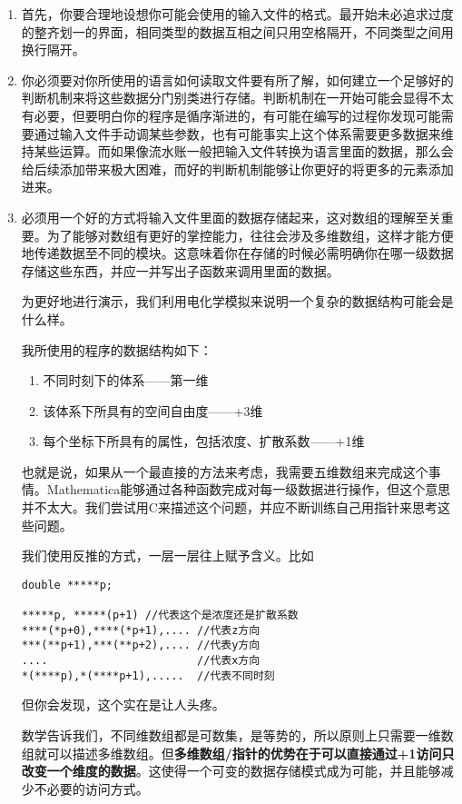 \documentclass[12pt,a4paper]{article}
\begin{document}
\begin{enumerate}
\item 首先，你要合理地设想你可能会使用的输入文件的格式。最开始未必追求过度的整齐划一的界面，相同类型的数据互相之间只用空格隔开，不同类型之间用换行隔开。

\item 你必须要对你所使用的语言如何读取文件要有所了解，如何建立一个足够好的判断机制来将这些数据分门别类进行存储。判断机制在一开始可能会显得不太有必要，但要明白你的程序是循序渐进的，有可能在编写的过程你发现可能需要通过输入文件手动调某些参数，也有可能事实上这个体系需要更多数据来维持某些运算。而如果像流水账一般把输入文件转换为语言里面的数据，那么会给后续添加带来极大困难，而好的判断机制能够让你更好的将更多的元素添加进来。

\item 必须用一个好的方式将输入文件里面的数据存储起来，这对数组的理解至关重要。为了能够对数组有更好的掌控能力，往往会涉及多维数组，这样才能方便地传递数据至不同的模块。这意味着你在存储的时候必需明确你在哪一级数据存储这些东西，并应一并写出子函数来调用里面的数据。

为更好地进行演示，我们利用电化学模拟来说明一个复杂的数据结构可能会是什么样。

我所使用的程序的数据结构如下：
\begin{enumerate}
	\item 不同时刻下的体系——第一维
	\item 该体系下所具有的空间自由度——+3维
	\item 每个坐标下所具有的属性，包括浓度、扩散系数——+1维
\end{enumerate}
也就是说，如果从一个最直接的方法来考虑，我需要五维数组来完成这个事情。Mathematica能够通过各种函数完成对每一级数据进行操作，但这个意思并不太大。我们尝试用C来描述这个问题，并应不断训练自己用指针来思考这些问题。

我们使用反推的方式，一层一层往上赋予含义。比如
\begin{lstlisting}
double *****p;

*****p, *****(p+1) //代表这个是浓度还是扩散系数
****(*p+0),****(*p+1),.... //代表z方向
***(**p+1),***(**p+2),.... //代表y方向
....                       //代表x方向
*(****p),*(****p+1),.....  //代表不同时刻
\end{lstlisting}
但你会发现，这个实在是让人头疼。

数学告诉我们，不同维数组都是可数集，是等势的，所以原则上只需要一维数组就可以描述多维数组。但\textbf{多维数组/指针的优势在于可以直接通过+1访问只改变一个维度的数据}。这使得一个可变的数据存储模式成为可能，并且能够减少不必要的访问方式。


\end{enumerate}
\end{document}
